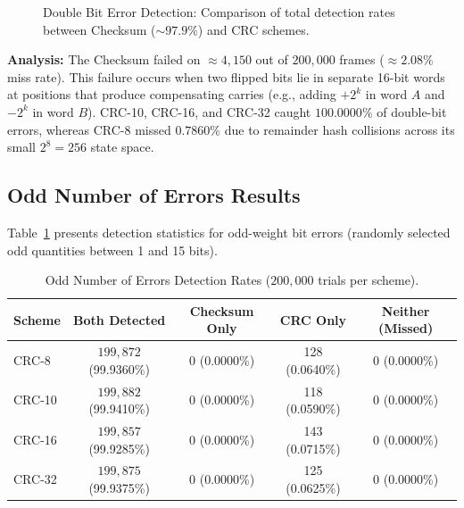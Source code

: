 \documentclass[11pt,a4paper]{article}
\begin{document}
\begin{figure}[H]
    \caption{Double Bit Error Detection: Comparison of total detection rates between Checksum ($\sim 97.9\%$) and CRC schemes.}
    \label{fig:double_bit_chart}
\end{figure}

\textbf{Analysis:} The Checksum failed on $\approx 4{,}150$ out of $200{,}000$ frames ($\approx 2.08\%$ miss rate). This failure occurs when two flipped bits lie in separate 16-bit words at positions that produce compensating carries (e.g., adding $+2^k$ in word $A$ and $-2^k$ in word $B$). CRC-10, CRC-16, and CRC-32 caught $100.0000\%$ of double-bit errors, whereas CRC-8 missed $0.7860\%$ due to remainder hash collisions across its small $2^8 = 256$ state space.

\subsection{Odd Number of Errors Results}

Table~\ref{tab:odd_bit} presents detection statistics for odd-weight bit errors (randomly selected odd quantities between 1 and 15 bits).

\begin{table}[H]
    \centering
    \begin{tabular}{lcccc}
        \toprule
        \textbf{Scheme} & \textbf{Both Detected} & \textbf{Checksum Only} & \textbf{CRC Only} & \textbf{Neither (Missed)} \\
        \midrule
        CRC-8  & $199{,}872$ (99.9360\%) & 0 (0.0000\%) & 128 (0.0640\%) & 0 (0.0000\%) \\
        CRC-10 & $199{,}882$ (99.9410\%) & 0 (0.0000\%) & 118 (0.0590\%) & 0 (0.0000\%) \\
        CRC-16 & $199{,}857$ (99.9285\%) & 0 (0.0000\%) & 143 (0.0715\%) & 0 (0.0000\%) \\
        CRC-32 & $199{,}875$ (99.9375\%) & 0 (0.0000\%) & 125 (0.0625\%) & 0 (0.0000\%) \\
        \bottomrule
    \end{tabular}
    \caption{Odd Number of Errors Detection Rates ($200{,}000$ trials per scheme).}
    \label{tab:odd_bit}
\end{table}
\end{document}
